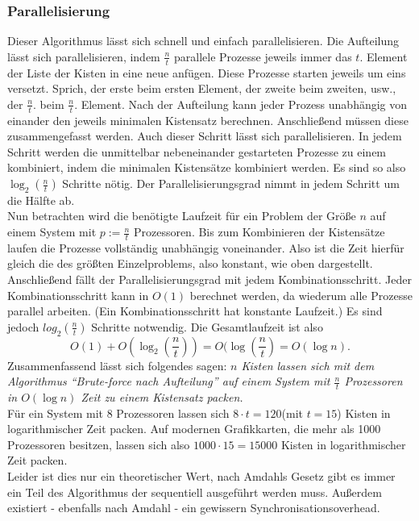 \subsubsection{Parallelisierung}
 Dieser Algorithmus lässt sich schnell und einfach parallelisieren.
 Die Aufteilung lässt sich parallelisieren, indem $\frac{n}{t}$ parallele Prozesse jeweils immer das $t.$ Element der Liste der Kisten in eine neue anfügen.
 Diese Prozesse starten jeweils um eins versetzt.
 Sprich, der erste beim ersten Element, der zweite beim zweiten, usw., der $\frac{n}{t}.$ beim $\frac{n}{t}.$ Element.
 Nach der Aufteilung kann jeder Prozess unabhängig von einander den jeweils minimalen Kistensatz berechnen.
 Anschließend müssen diese zusammengefasst werden. Auch dieser Schritt lässt sich parallelisieren.
 In jedem Schritt werden die unmittelbar nebeneinander gestarteten Prozesse zu einem kombiniert, indem die minimalen Kistensätze kombiniert werden.
 Es sind so also $\log_2(\frac{n}{t})$ Schritte nötig. Der Parallelisierungsgrad nimmt in jedem Schritt um die Hälfte ab.\\
 Nun betrachten wird die benötigte Laufzeit für ein Problem der Größe $n$ auf einem System mit $p := \frac{n}{t}$ Prozessoren.
 Bis zum Kombinieren der Kistensätze laufen die Prozesse vollständig unabhängig voneinander.
 Also ist die Zeit hierfür gleich die des größten Einzelproblems, also konstant, wie oben dargestellt.
 Anschließend fällt der Parallelisierungsgrad mit jedem Kombinationsschritt.
 Jeder Kombinationsschritt kann in $O(1)$ berechnet werden, da wiederum alle Prozesse parallel arbeiten.
 (Ein Kombinationsschritt hat konstante Laufzeit.)
 Es sind jedoch $log_2(\frac{n}{t})$ Schritte notwendig.
 Die Gesamtlaufzeit ist also \[O(1)+O(\log_2(\frac{n}{t}))=O(\log(\frac{n}{t})=O(\log n).\]
 Zusammenfassend lässt sich folgendes sagen:
 \emph{$n$ Kisten lassen sich mit dem Algorithmus ``Brute-force nach Aufteilung'' auf einem System mit $\frac{n}{t}$ Prozessoren in $O(\log n)$ Zeit zu einem Kistensatz packen.}
\\
 Für ein System mit 8 Prozessoren lassen sich $8 \cdot t = 120$(mit $t=15$) Kisten in logarithmischer Zeit packen.
 Auf modernen Grafikkarten, die mehr als 1000 Prozessoren besitzen, lassen sich also $1000 \cdot 15=15000$ Kisten in logarithmischer Zeit packen.\\
 Leider ist dies nur ein theoretischer Wert, nach Amdahls Gesetz gibt es immer ein Teil des Algorithmus der sequentiell ausgeführt werden muss.
 Außerdem existiert - ebenfalls nach Amdahl - ein gewissern Synchronisationsoverhead.
